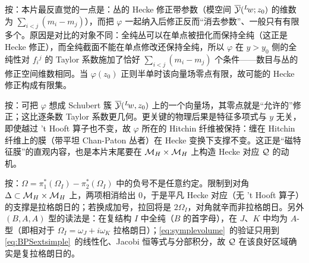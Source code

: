 \begin{yizhu}[易错点]
按：本片最反直觉的一点是：丛的 Hecke 修正带参数（模空间 $\overline {{\mathcal{Y}}}({}^L\negthinspace w;z_0)$ 的维数为 $\sum_{i<j}(m_i-m_j)$），而把 $\varphi$ 一起纳入后修正反而“消去参数”、一般只有有限多个。原因是对比的对象不同：全纯丛可以在单点被扭化而保持全纯（这正是 Hecke 修正），而全纯截面不能在单点修改还保持全纯，所以 $\varphi$ 在 $y>y_0$ 侧的全纯性对 $f_i{}^j$ 的 Taylor 系数施加了恰好 $\sum_{i<j}(m_i-m_j)$ 个条件——数目与丛的修正空间维数相同。当 $\varphi(z_0)$ 正则半单时该向量场零点有限，故可能的 Hecke 修正构成有限集。
\end{yizhu}

\begin{yizhu}[物理图像]
按：可把 $\varphi$ 想成 Schubert 簇 $\overline {{\mathcal{Y}}}({}^L\negthinspace w,z_0)$ 上的一个向量场，其零点就是“允许的”修正；这比逐条数 Taylor 系数更几何。更关键的物理后果是特征多项式与 $y$ 无关，即使越过 't Hooft 算子也不变，故 $\varphi$ 所在的 Hitchin 纤维被保持：缠在 Hitchin 纤维上的膜（带平坦 Chan-Paton 丛者）在 Hecke 变换下支撑不变。这正是“磁特征膜”的直观内容，也是本片末尾要在 ${{{\mathcal{M}}}_H}\times{{{\mathcal{M}}}_H}$ 上构造 Hecke 对应 ${{\mathcal{Q}}}$ 的动机。
\end{yizhu}

\begin{yizhu}[易错点]
按：$\Omega=\pi_1^*(\Omega_I)-\pi_2^*(\Omega_I)$ 中的负号不是任意约定。限制到对角 $\Delta\subset{{{\mathcal{M}}}_H}\times{{{\mathcal{M}}}_H}$ 上，两项相消给出 $0$，于是平凡 Hecke 对应（无 't Hooft 算子）的支撑是拉格朗日的；若换成加号，拉回将是 $2\Omega_I$，对角就辛而非拉格朗日。另外 $(B,A,A)$ 型的读法是：在复结构 $I$ 中全纯（$B$ 的首字母），在 $J$、$K$ 中均为 $A$-型（即相对于 $\Omega_I=\omega_J+i\omega_K$ 拉格朗日）；\eqref{eq:symplevolume}\ 的验证只用到 \eqref{eq:BPSextsimple}\ 的线性化、Jacobi 恒等式与分部积分，故 ${{\mathcal{Q}}}$ 在该良好区域确实是复拉格朗日的。
\end{yizhu}

